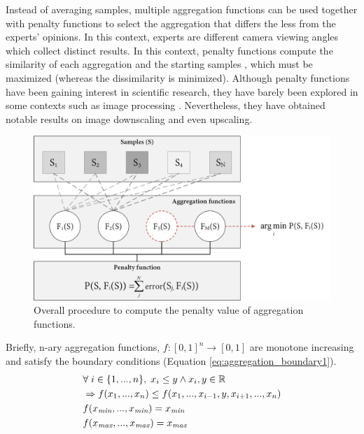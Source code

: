 Instead of averaging samples, multiple aggregation functions can be used together with penalty functions to select the aggregation that differs the less from the experts' opinions. In this context, experts are different camera viewing angles which collect distinct results. In this context, penalty functions compute the similarity of each aggregation and the starting samples \cite{bustince_definition_2017, bustince_penalty_2017}, which must be maximized (whereas the dissimilarity is minimized). Although penalty functions have been gaining interest in scientific research, they have barely been explored in some contexts such as image processing \cite{paternain_color_2012, paternain_construction_2015}. Nevertheless, they have obtained notable results on image downscaling and even upscaling.

\begin{figure}[ht]
	\includegraphics[width=\linewidth]{figs/fundamentals/penalty_functions.png}
	\caption{Overall procedure to compute the penalty value of aggregation functions.}
	\label{fig:penalty_funtions}
\end{figure}
Briefly, n-ary aggregation functions, $f: [0, 1]^n \rightarrow [0, 1]$ are monotone increasing and satisfy the boundary conditions (Equation \ref{eq:aggregation_boundary1}).  
\begin{gather}
    \begin{aligned}
        &\forall \hspace{1mm} i \in \{1,...,n\}, \hspace{1mm} x_i \leq y \land x_i, y \in \mathbb{R}\\
        &\Rightarrow f(x_1,...,x_n) \leq f(x_1,..., x_{i-1}, y, x_{i+1},...,x_n)\\
        &f(x_{\textit{min}},...,x_{\textit{min}}) = x_{\textit{min}}\\
        &f(x_{\textit{max}},...,x_{\textit{max}}) = x_{\textit{max}}
    \end{aligned}
    \label{eq:aggregation_boundary1}
\end{gather}

